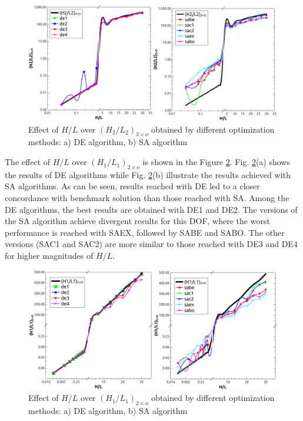 \documentclass[12pt,fleqn]{article}
\begin{document}
\begin{figure}[H]
\centering
\includegraphics[width=0.9\linewidth]{imgs/5dof/de_sa_hl_h2l2.png}
\caption{ {\small Effect of $H/L$ over ${(H_{2}/L_{2})_{3\times o}}$ obtained by different optimization methods: a) DE algorithm, b) SA algorithm}}
\label{figure06}
\end{figure}


The effect of $H/L$ over ${(H_{1}/L_{1})_{2\times o}}$ is shown in the Figure \ref{figure07}. Fig. \ref{figure07}(a) shows the results of DE algorithms while Fig. \ref{figure07}(b) illustrate the results achieved with SA algorithms. As can be seen, results reached with DE led to a closer concordance with benchmark solution than those reached with SA. Among the DE algorithms, the best results are obtained with DE1 and DE2. The versions of the SA algorithm achieve divergent results for this DOF, where the worst performance is reached with SAEX, followed by  SABE and SABO. The other versions (SAC1 and SAC2) are more similar to those reached with DE3 and DE4 for higher magnitudes of $H/L$.


\begin{figure}[H]
\centering
\includegraphics[width=0.9\linewidth]{imgs/5dof/de_sa_hl_h1l1.png}
\caption{ {\small Effect of $H/L$ over ${(H_{1}/L_{1})_{2\times o}}$ obtained by different optimization methods: a) DE algorithm, b) SA algorithm}}
\label{figure07}
\end{figure}
\end{document}
